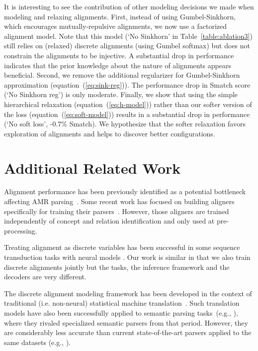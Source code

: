 \documentclass[11pt,a4paper]{article}
\begin{document}
It is interesting to see the contribution of other modeling 
decisions we made when modeling and relaxing alignments. First, instead of using Gumbel-Sinkhorn,
which encourages mutually-repulsive alignments, we now use a factorized alignment model. Note that this model (`No Sinkhorn' in
Table~\ref{table:ablation3}) 
still relies on (relaxed) discrete alignments (using Gumbel softmax) but does not constrain the alignments to be injective.
A substantial drop in performance indicates that the prior knowledge about  the nature of alignments appears beneficial.
Second, we remove the additional regularizer for Gumbel-Sinkhorn approximation (equation~(\ref{eq:sink-reg})). The performance drop
in Smatch score (`No Sinkhorn reg') is only moderate.
Finally, we show that using the simple hierarchical relaxation (equation~(\ref{eq:h-model})) rather than our softer version of the loss (equation~(\ref{eq:soft-model}))
results in a substantial drop in performance (`No soft loss', -0.7\% Smatch). We hypothesize that the softer relaxation favors exploration of alignments and helps to discover better configurations.



\section{Additional Related Work}
Alignment performance has been previously identified as a potential bottleneck affecting AMR parsing~\cite{Marco,foland-martin:2017:Long}. Some recent work  has focused on building aligners specifically for training their parsers~\cite{werling2015robust,wang2017getting}. 
However, those aligners are trained independently of concept and relation identification and only used at  pre-processing. 

Treating alignment as discrete variables has been successful in some sequence transduction tasks with neural models \cite{Noisy_Channel,seg_to_seg}. Our work is similar in that we also train discrete alignments jointly but the tasks, the inference framework and the decoders are very different. 

The discrete alignment modeling framework has been developed in the context of traditional (i.e. non-neural) statistical machine translation~\cite{IBM}. 
Such translation models have also been
successfully applied to semantic parsing tasks~(e.g., \cite{andreas2013semantic}), where they rivaled specialized semantic parsers from that period. However, they are considerably less accurate than current state-of-the-art parsers applied to the same datasets (e.g., \cite{dong2016language}).
\end{document}
